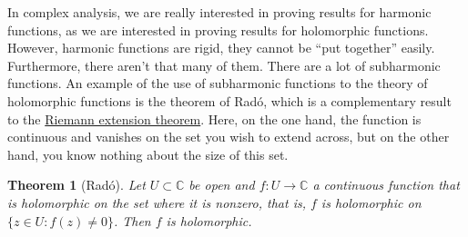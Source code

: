 \documentclass[12pt,openany]{book}
\newcommand{\C}{{\mathbb{C}}}
\newcommand{\myquote}[1]{``#1''}
\theoremstyle{plain}
\newtheorem{thm}{Theorem}[section]
\theoremstyle{remark}
\theoremstyle{definition}
\theoremstyle{exercise}
\theoremstyle{example}
\begin{document}
In complex analysis,
we are really interested in proving results for harmonic functions,
as we are interested in proving results for holomorphic functions.
However, harmonic functions are rigid, they cannot be
\myquote{put together} easily.
Furthermore, there aren't that many of them.  There are a lot of
subharmonic functions.
An example of the use of subharmonic functions to
the theory of holomorphic functions is the theorem of 
Rad\'o, which is a complementary result to the
\hyperref[thm:riemannext]{Riemann extension theorem}.
Here, on the one hand, the function is
continuous and vanishes on the set you wish to extend across, but on the
other hand, you know nothing about the size of this set.

\begin{thm}[Rad\'o]\label{thm:rado}
Let $U \subset \C$ be open and $f \colon U \to \C$ a continuous
function that is holomorphic on the set where it is nonzero, that is,
$f$ is holomorphic on $\bigl\{ z \in U : f(z) \not= 0 \bigr\}$.
Then $f$ is holomorphic.
\end{thm}
\end{document}
